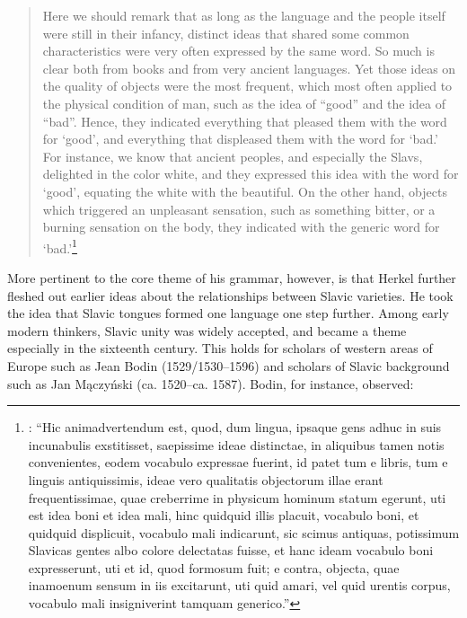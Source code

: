 \begin{quote}
    Here we should remark that as long as the language and the people itself were still in their infancy, distinct ideas that shared some common characteristics were very often expressed by the same word. So much is clear both from books and from very ancient languages. Yet those ideas on the quality of objects were the most frequent, which most often applied to the physical condition of man, such as the idea of “good” and the idea of “bad”. Hence, they indicated everything that pleased them with the word for ‘good’, and everything that displeased them with the word for ‘bad.’ For instance, we know that ancient peoples, and especially the Slavs, delighted in the color white, and they expressed this idea with the word for ‘good’, equating the white with the beautiful. On the other hand, objects which triggered an unpleasant sensation, such as something bitter, or a burning sensation on the body, they indicated with the generic word for ‘bad.’\footnote{\citet[101]{herkel_elementa_1826}: “Hic animadvertendum est, quod, dum lingua, ipsaque gens adhuc in suis incunabulis exstitisset, saepissime ideae distinctae, in aliquibus tamen notis convenientes, eodem vocabulo expressae fuerint, id patet tum e libris, tum e linguis antiquissimis, ideae vero qualitatis objectorum illae erant frequentissimae, quae creberrime in physicum hominum statum egerunt, uti est idea boni et idea mali, hinc quidquid illis placuit, vocabulo boni, et quidquid displicuit, vocabulo mali indicarunt, sic scimus antiquas, potissimum Slavicas gentes albo colore delectatas fuisse, et hanc ideam vocabulo boni expresserunt, uti et id, quod formosum fuit; e contra, objecta, quae inamoenum sensum in iis excitarunt, uti quid amari, vel quid urentis corpus, vocabulo mali insigniverint tamquam generico.”}
\end{quote}

\noindent More pertinent to the core theme of his grammar, however, is that Herkel further fleshed out earlier ideas about the relationships between Slavic varieties. He took the idea that Slavic tongues formed one language one step further. Among early modern thinkers, Slavic unity was widely accepted, and became a theme especially in the sixteenth century. This holds for scholars of western areas of Europe such as Jean Bodin (1529/1530--1596) and scholars of Slavic background such as Jan Mączyński (ca. 1520--ca. 1587). Bodin, for instance, observed:


